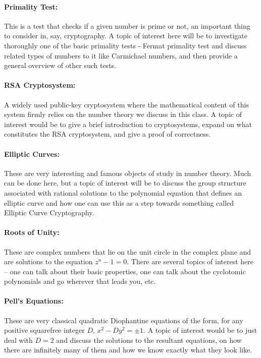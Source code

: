 \documentclass[11pt]{article}
\theoremstyle{plain}
\theoremstyle{definition}
\theoremstyle{remark}
\numberwithin{equation}{section}
\begin{document}
\paragraph{Primality Test:} This is a test that checks if a given number is prime or not, an important thing to consider in, say, cryptography. A topic of interest here will be to investigate thoroughly one of the basic primality tests - Fermat primality test and discuss related types of numbers to it like Carmichael numbers, and then provide a general overview of other such tests.

\paragraph{RSA Cryptosystem:} A widely used public-key cryptosystem where the mathematical content of this system firmly relies on the number theory we discuss in this class. A topic of interest would be to give a brief introduction to cryptosystems, expand on what constitutes the RSA cryptosystem, and give a proof of correctness.

\paragraph{Elliptic Curves:} These are very interesting and famous objects of study in number theory. Much can be done here, but a topic of interest will be to discuss the group structure associated with rational solutions to the polynomial equation that defines an elliptic curve and how one can use this as a step towards something called Elliptic Curve Cryptography.

\paragraph{Roots of Unity:} These are complex numbers that lie on the unit circle in the complex plane and are solutions to the equation $z^n - 1 = 0$. There are several topics of interest here – one can talk about their basic properties, one can talk about the cyclotomic polynomials and go wherever that leads you, etc.

\paragraph{Pell's Equations:} These are very classical quadratic Diophantine equations of the form, for any positive squarefree integer $D$, $x^2 - Dy^2 = \pm 1$. A topic of interest would be to just deal with $D = 2$ and discuss the solutions to the resultant equations, on how there are infinitely many of them and how we know exactly what they look like.
\end{document}
